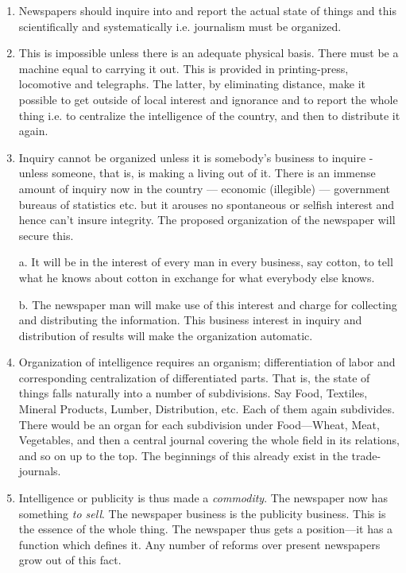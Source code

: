 \documentclass[openany,nobib]{tufte-book}
\begin{document}
\begin{enumerate}


    \item Newspapers
 should inquire into and report the actual state of things
and this scientifically and systematically i.e. journalism must be
organized.

    \item This is impossible unless there is an adequate physical basis. There
must be a machine equal to carrying it out. This is provided in
printing-press, locomotive and telegraphs. The latter, by eliminating
distance, make it possible to get outside of local interest and
ignorance and to report the whole thing i.e. to centralize the
intelligence of the country, and then to distribute it again.

    \item Inquiry cannot be organized unless it is somebody's business to
inquire - unless someone, that is, is making a living out of it. There
is an immense amount of inquiry now in the country --- economic
(illegible) --- government bureaus of statistics etc. but it arouses no
spontaneous or selfish interest and hence can't insure integrity. The
proposed organization of the newspaper will secure this.

a. It will be in the interest of every man in every business, say
cotton, to tell what he knows about cotton in exchange for what
everybody else knows.

b. The newspaper man will make use of this interest and charge for
collecting and distributing the information. This business interest in
inquiry and distribution of results will make the organization
automatic.

    \newpage\item Organization of intelligence requires an organism; differentiation of
labor and corresponding centralization of differentiated parts. That is,
the state of things falls naturally into a number of subdivisions. Say
Food, Textiles, Mineral Products, Lumber, Distribution, etc. Each of
them again subdivides. There would be an organ for each subdivision
under Food---Wheat, Meat, Vegetables, and then a central journal
covering the whole field in its relations, and so on up to the top. The
beginnings of this already exist in the trade-journals.

    \item Intelligence or publicity is thus made a \emph{commodity}. The
newspaper now has something \emph{to sell}. The newspaper business is
the publicity business. This is the essence of the whole thing. The
newspaper thus gets a position---it has a function which defines it. Any
number of reforms over present newspapers grow out of this fact.


\end{enumerate}
\end{document}
